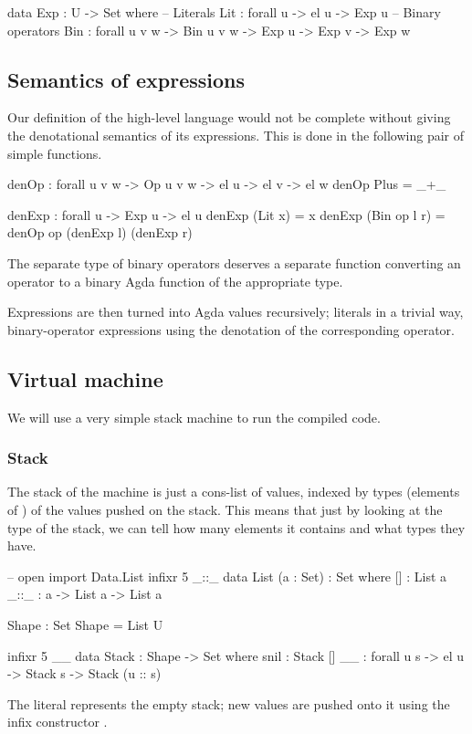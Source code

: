 \begin{code}
  data Exp : U -> Set where
    -- Literals
    Lit : forall {u} -> el u -> Exp u
    -- Binary operators
    Bin : forall {u v w} -> Bin u v w -> Exp u -> Exp v -> Exp w
\end{code}

\subsection{Semantics of expressions}

Our definition of the high-level language would not be complete without giving
the denotational semantics of its expressions. This is done in the following
pair of simple functions.

\begin{code}
  denOp : forall {u v w} -> Op u v w -> el u -> el v -> el w
  denOp Plus = _+\_

  denExp : forall {u} -> Exp u -> el u
  denExp (Lit x) = x
  denExp (Bin op l r) = denOp op (denExp l) (denExp r)
\end{code}

\noindent The separate type of binary operators deserves a separate function
converting an operator to a binary Agda function of the appropriate type.

Expressions are then turned into Agda values recursively; literals in a trivial
way, binary-operator expressions using the denotation of the corresponding
operator.

\subsection{Virtual machine}

We will use a very simple stack machine to run the compiled code.

\subsubsection{Stack}

The stack of
the machine is just a cons-list of values, indexed by types (elements of
) of the values pushed on the stack.  This means that just by looking
at the type of the stack, we can tell how many elements it contains and what
types they have.
\begin{code}
  -- open import Data.List
  infixr 5 _::_
  data List (a : Set) : Set where
    [] : List a
    _::_ : a -> List a -> List a

  Shape : Set
  Shape = List U

  infixr 5 _\scons\_
  data Stack : Shape -> Set where
    snil : Stack []
    _\scons\_ : forall {u s} -> el u -> Stack s -> Stack (u :: s)
\end{code}
\noindent The literal  represents the empty stack; new values are
pushed onto it using the infix constructor \ident{\bin{\scons}}.

